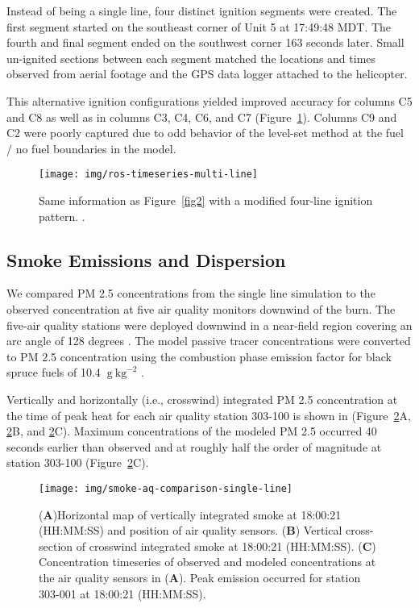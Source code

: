 \documentclass[preprints,article,accept,moreauthors,pdftex]{Definitions/mdpi}
\begin{document}
Instead of being a single line, four distinct ignition segments were created. The first segment started on the southeast corner of Unit 5 at 17:49:48 MDT. The fourth and final segment ended on the southwest corner 163 seconds later. Small un-ignited sections between each segment matched the locations and times observed from aerial footage and the GPS data logger attached to the helicopter.

This alternative ignition configurations yielded improved accuracy for columns C5 and C8 as well as in columns C3, C4, C6, and C7 (Figure~\ref{fig3}). Columns C9 and C2 were poorly captured due to odd behavior of the level-set method at the fuel / no fuel boundaries in the model.

\begin{figure}[H]
\centering
 \texttt{[image: img/ros-timeseries-multi-line]}
 \caption{Same information as Figure~\ref{fig2} with a modified four-line ignition pattern. .\label{fig3}}
 \end{figure}

\subsection{Smoke Emissions and Dispersion}

We compared PM 2.5 concentrations from the single line simulation to the observed concentration at five air quality monitors downwind of the burn. The five-air quality stations were deployed downwind in a near-field region covering an arc angle of 128 degrees \cite{huda_study_2020}. The model passive tracer concentrations were converted to PM 2.5 concentration using the combustion phase emission factor for black spruce fuels of 10.4 $\mathrm{~g}\mathrm{~kg}^{-2}$ \cite{prichard_wildland_2020}.


Vertically and horizontally (i.e., crosswind) integrated PM 2.5 concentration at the time of peak heat for each air quality station 303-100 is shown in (Figure~\ref{fig4}A, \ref{fig4}B, and \ref{fig4}C). Maximum concentrations of the modeled PM 2.5 occurred 40 seconds earlier than observed and at roughly half the order of magnitude at station 303-100 (Figure~\ref{fig4}C).

\begin{figure}[H]
\centering
 \texttt{[image: img/smoke-aq-comparison-single-line]}
 \caption{(\textbf{A})Horizontal map of vertically integrated smoke at 18:00:21 (HH:MM:SS) and position of air quality sensors. (\textbf{B}) Vertical cross-section of crosswind integrated smoke at 18:00:21 (HH:MM:SS). (\textbf{C}) Concentration timeseries of observed and modeled concentrations at the air quality sensors in (\textbf{A}). Peak emission occurred for station 303-001 at 18:00:21 (HH:MM:SS).\label{fig4}}
 \end{figure}
\end{document}
